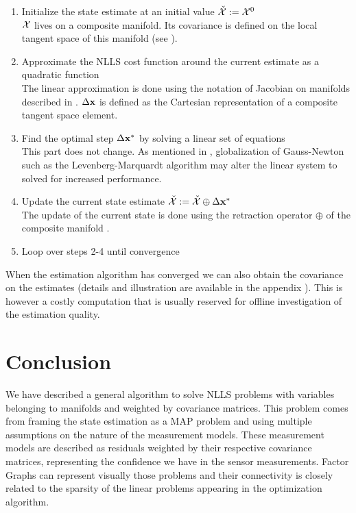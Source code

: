 \begin{enumerate}
    \item Initialize the state estimate at an initial value $\check{\mathcal{X}} := \mathcal{X}^0$ \\
    $\mathcal{X}$ lives on a composite manifold. Its covariance is defined on the local tangent space of this manifold (see ).
    \item Approximate the NLLS cost function around the current estimate as a quadratic function \\
    The linear approximation is done using the notation of Jacobian on manifolds described in .
    $\Delta {\bf x}$ is defined as the Cartesian representation of a composite tangent space element.  
    \item Find the optimal step $\Delta {\bf x}^*$ by solving a linear set of equations  \\
    This part does not change. As mentioned in , globalization of Gauss-Newton such as the Levenberg-Marquardt algorithm
    may alter the linear system to solved for increased performance.
    \item Update the current state estimate $\check{\mathcal{X}} := \check{\mathcal{X}} \oplus \Delta {\bf x}^*$ \\
    The update of the current state is done using the retraction operator $\oplus$ of the composite manifold .
    \item Loop over steps 2-4 until convergence
\end{enumerate}

When the estimation algorithm has converged we can also obtain the covariance on the estimates (details and illustration are available in the 
appendix ). This is however a costly computation that is usually reserved for offline investigation of the estimation quality. 

\section{Conclusion}


We have described a general algorithm to solve NLLS problems with variables belonging to manifolds and weighted by covariance matrices. This problem
comes from framing the state estimation as a MAP problem and using multiple assumptions on the nature of the measurement models. These measurement models
are described as residuals weighted by their respective covariance matrices, representing the confidence we have in the sensor measurements. Factor Graphs can 
represent visually those problems and their connectivity is closely related to the sparsity of the linear problems appearing in the optimization algorithm.


